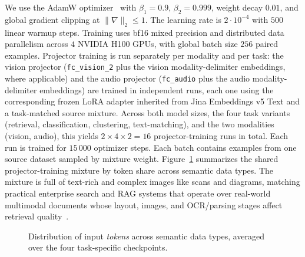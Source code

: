 We use the AdamW optimizer~\cite{adamw} with $\beta_1{=}0.9$, $\beta_2{=}0.999$, weight decay $0.01$, and global gradient clipping at $\lVert \nabla \rVert_2 \le 1$.
The learning rate is $2{\cdot}10^{-4}$ with $500$ linear warmup steps.
Training uses bf16 mixed precision and distributed data parallelism across $4$ NVIDIA H100 GPUs, with global batch size $256$ paired examples.
Projector training is run separately per modality and per task: the vision projector (\texttt{fc\_vision\_2} plus the vision modality-delimiter embeddings, where applicable) and the audio projector (\texttt{fc\_audio} plus the audio modality-delimiter embeddings) are trained in independent runs, each one using the corresponding frozen LoRA adapter inherited from Jina Embeddings v5 Text and a task-matched source mixture.
Across both model sizes, the four task variants (retrieval, classification, clustering, text-matching), and the two modalities (vision, audio), this yields $2 \times 4 \times 2 = 16$ projector-training runs in total.
Each run is trained for $15\,000$ optimizer steps.
Each batch contains examples from one source dataset sampled by mixture weight.
Figure~\ref{fig:data-distribution} summarizes the shared projector-training mixture by token share across semantic data types.
The mixture is full of text-rich and complex images like scans and diagrams, matching practical enterprise search and RAG systems that operate over real-world multimodal documents whose layout, images, and OCR/parsing stages affect retrieval quality~\cite{rag,visrag}.

\begin{figure}[H]
\centering

\caption{Distribution of input \emph{tokens} across semantic data types, averaged over the four task-specific checkpoints.}
\label{fig:data-distribution}
\end{figure}
